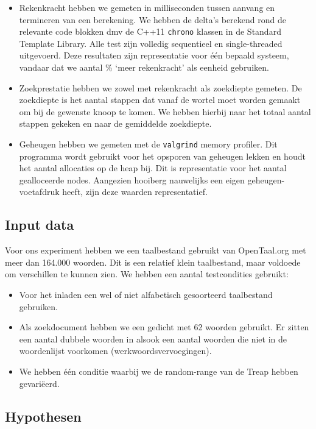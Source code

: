\documentclass[a4paper,10pt]{article}
\begin{document}
\begin{itemize}
\item Rekenkracht hebben we gemeten in milliseconden tussen aanvang en termineren van een berekening. We hebben de delta's berekend rond de relevante code blokken dmv de C++11 \texttt{chrono} klassen in de Standard Template Library. Alle test zijn volledig sequentieel en single-threaded uitgevoerd. Deze resultaten zijn representatie voor \'e\'en bepaald systeem, vandaar dat we aantal \% `meer rekenkracht' als eenheid gebruiken.
\item Zoekprestatie hebben we zowel met rekenkracht als zoekdiepte gemeten. De zoekdiepte is het aantal stappen dat vanaf de wortel moet worden gemaakt om bij de gewenste knoop te komen. We hebben hierbij naar het totaal aantal stappen gekeken en naar de gemiddelde zoekdiepte.
\item Geheugen hebben we gemeten met de \texttt{valgrind} memory profiler. Dit programma wordt gebruikt voor het opsporen van geheugen lekken en houdt het aantal allocaties op de heap bij. Dit is representatie voor het aantal gealloceerde nodes. Aangezien hooiberg nauwelijks een eigen geheugen-voetafdruk heeft, zijn deze waarden representatief.
\end{itemize}

\subsection{Input data}

Voor ons experiment hebben we een taalbestand gebruikt van OpenTaal.org met meer dan 164.000 woorden. Dit is een relatief klein taalbestand, maar voldoede om verschillen te kunnen zien. We hebben een aantal testcondities gebruikt:
\begin{itemize}
\item Voor het inladen een wel of niet alfabetisch gesoorteerd taalbestand gebruiken.
\item Als zoekdocument hebben we een gedicht met 62 woorden gebruikt. Er zitten een aantal dubbele woorden in alsook een aantal woorden die niet in de woordenlijst voorkomen (werkwoordsvervoegingen).
\item We hebben \'e\'en conditie waarbij we de random-range van de Treap hebben gevari\"eerd.
\end{itemize}

\subsection{Hypothesen}
\end{document}

